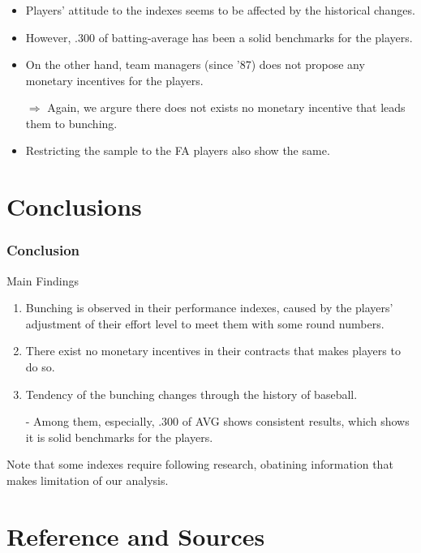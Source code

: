 \documentclass[dvipdfmx,12pt]{beamer}
\begin{document}
\begin{frame}\frametitle{}
  \begin{itemize}
    \item Players' attitude to the indexes seems to be affected by the historical changes.

    \item However, .300 of batting-average has been a solid benchmarks for the players.

    \item On the other hand, team managers (since '87) does not propose any monetary incentives for the players.

    $\Rightarrow$ Again, we argure there does not exists no monetary incentive that leads them to bunching.

    \item Restricting the sample to the FA players also show the same.
  \end{itemize}
\end{frame}

\section{Conclusions}
\begin{frame}\frametitle{Conclusion}
  Main Findings
  \begin{enumerate}
    \item Bunching is observed in their performance indexes, caused by the players' adjustment of their effort level to meet them with some round numbers.

    \item There exist no monetary incentives in their contracts that makes players to do so.

    \item Tendency of the bunching changes through the history of baseball.

    - Among them, especially, .300 of AVG shows consistent results, which shows it is solid benchmarks for the players.
  \end{enumerate}

  Note that some indexes require following research, obatining information that makes limitation of our analysis.
\end{frame}

\section*{Reference and Sources}
\end{document}

